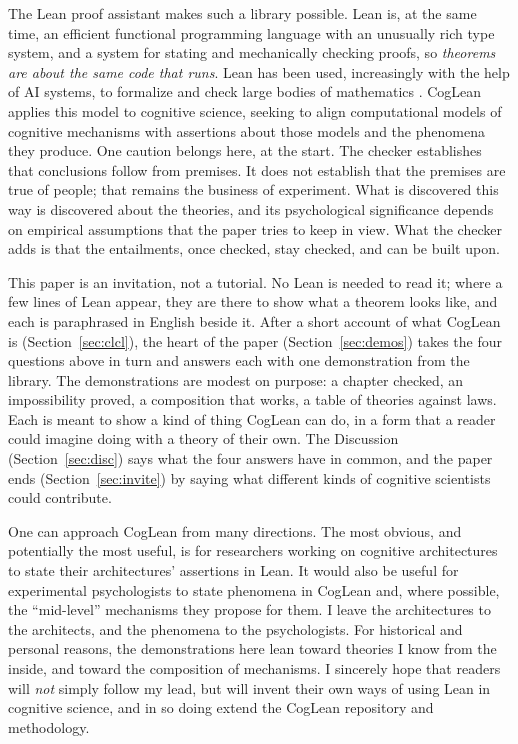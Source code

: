 \documentclass[11pt]{article}
\begin{document}
The Lean proof assistant \citep{demoura2021} makes such a library
possible. Lean is, at the same time, an efficient functional
programming language with an unusually rich type system, and a system
for stating and mechanically checking proofs, so \emph{theorems are
about the same code that runs}. Lean has been used, increasingly with
the help of AI systems, to formalize and check large bodies of
mathematics \citep{mathlib2020}. CogLean applies this model to
cognitive science, seeking to align computational models of cognitive
mechanisms with assertions about those models and the phenomena they
produce. One caution belongs here, at the start. The checker
establishes that conclusions follow from premises. It does not
establish that the premises are true of people; that remains the
business of experiment. What is discovered this way is discovered
about the theories, and its psychological significance depends on
empirical assumptions that the paper tries to keep in view. What the
checker adds is that the entailments, once checked, stay checked, and
can be built upon.

This paper is an invitation, not a tutorial. No Lean is needed to read
it; where a few lines of Lean appear, they are there to show what a
theorem looks like, and each is paraphrased in English beside it.
After a short account of what CogLean is (Section~\ref{sec:clcl}), the
heart of the paper (Section~\ref{sec:demos}) takes the four questions
above in turn and answers each with one demonstration from the
library. The demonstrations are modest on purpose: a chapter checked,
an impossibility proved, a composition that works, a table of
theories against laws. Each is meant to show a kind of thing CogLean
can do, in a form that a reader could imagine doing with a theory of
their own. The Discussion (Section~\ref{sec:disc}) says what the four
answers have in common, and the paper ends (Section~\ref{sec:invite})
by saying what different kinds of cognitive scientists could
contribute.

One can approach CogLean from many directions. The most obvious, and
potentially the most useful, is for researchers working on cognitive
architectures to state their architectures' assertions in Lean. It
would also be useful for experimental psychologists to state phenomena
in CogLean and, where possible, the ``mid-level'' mechanisms they
propose for them. I leave the architectures to the architects, and the
phenomena to the psychologists. For historical and personal reasons,
the demonstrations here lean toward theories I know from the inside,
and toward the composition of mechanisms. I sincerely hope that readers
will \emph{not} simply follow my lead, but will invent their own ways
of using Lean in cognitive science, and in so doing extend the CogLean
repository and methodology.
\end{document}
